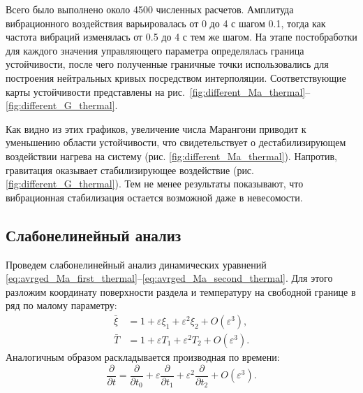 \documentclass[12pt,a4paper]{article}
\begin{document}
Всего было выполнено около 4500 численных расчетов. Амплитуда вибрационного воздействия варьировалась от 0 до 4 с шагом 0.1, тогда как частота вибраций изменялась от 0.5 до 4 с тем же шагом. На этапе постобработки для каждого значения управляющего параметра определялась граница устойчивости, после чего полученные граничные точки использовались для построения нейтральных кривых посредством интерполяции. Соответствующие карты устойчивости представлены на рис.~\ref{fig:different_Ma_thermal}--\ref{fig:different_G_thermal}.

Как видно из этих графиков, увеличение числа Марангони приводит к уменьшению области устойчивости, что свидетельствует о дестабилизирующем воздействии нагрева на систему (рис. \ref{fig:different_Ma_thermal}). Напротив, гравитация оказывает стабилизирующее воздействие (рис. \ref{fig:different_G_thermal}). Тем не менее результаты показывают, что вибрационная стабилизация остается возможной даже в невесомости.

\subsection{Слабонелинейный анализ}\label{subsection:weakly_nonlinear_thermo}

Проведем слабонелинейный анализ динамических уравнений  \eqref{eq:avrged_Ma_first_thermal}--\eqref{eq:avrged_Ma_second_thermal}. Для этого разложим координату поверхности раздела и температуру на свободной границе в ряд по малому параметру:
\begin{align}
	\bar{\xi} &= 1 + \varepsilon\xi_1 + \varepsilon^2\xi_2 + O(\varepsilon^3), \\
	\bar{T} &= 1 + \varepsilon T_1 + \varepsilon^2 T_2 + O(\varepsilon^3).
\end{align}
Аналогичным образом раскладывается производная по времени:
\begin{equation}
	\frac{\partial}{\partial t} =
	\frac{\partial}{\partial t_0}
	+ \varepsilon\frac{\partial}{\partial t_1}
	+ \varepsilon^2\frac{\partial}{\partial t_2}
	+ O(\varepsilon^3).
\end{equation}
\end{document}

